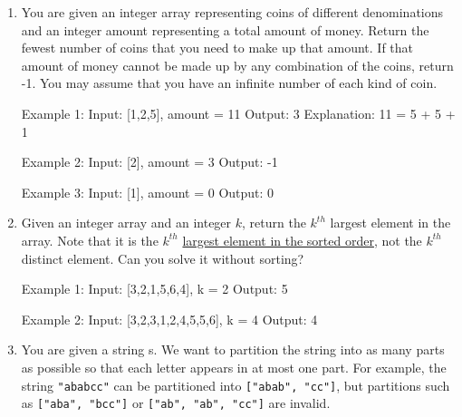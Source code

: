 \begin{enumerate}
\begin{consolethree}
Example 1:
Input: [1,2,0]
Output: 3
Explanation: The numbers in the range [1,2] are all in the array.

Example 2:
Input: [3,4,-1,1]
Output: 2
Explanation: 1 is in the array but 2 is missing.

Example 3:
Input: [7,8,9,11,12]
Output: 1
Explanation: The smallest positive integer 1 is missing.
\end{consolethree}
\newpage


\item 
You are given an integer array representing coins of different denominations and an integer amount representing a total amount of money.
Return the fewest number of coins that you need to make up that amount. If that amount of money cannot be made up by any combination of the coins, return -1.
You may assume that you have an infinite number of each kind of coin.
\begin{consolethree}
Example 1:
Input: [1,2,5], amount = 11
Output: 3
Explanation: 11 = 5 + 5 + 1

Example 2:
Input: [2], amount = 3
Output: -1

Example 3:
Input: [1], amount = 0
Output: 0
\end{consolethree}
\newpage


\item 
Given an integer array and an integer $k$, return the $k^{th}$ largest element in the array.
Note that it is the $k^{th}$ \underline{largest element in the sorted order}, not the $k^{th}$ distinct element.
Can you solve it without sorting?

\begin{consolethree}
Example 1:
Input: [3,2,1,5,6,4], k = 2
Output: 5

Example 2:
Input: [3,2,3,1,2,4,5,5,6], k = 4
Output: 4
\end{consolethree}
\newpage


\item 
You are given a string s. We want to partition the string into as many parts as possible so that each letter appears in at most one part. For example, the string \texttt{"ababcc"} can be partitioned into \texttt{["abab", "cc"]}, but partitions such as \texttt{["aba", "bcc"]} or \texttt{["ab", "ab", "cc"]} are invalid.


\end{enumerate}
